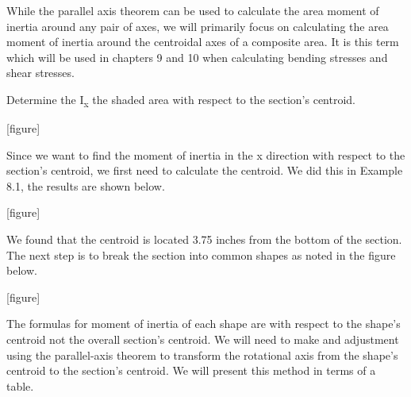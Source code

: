 \documentclass[
  letterpaper,
  DIV=11,
  numbers=noendperiod]{scrreprt}
\begin{document}
While the parallel axis theorem can be used to calculate the area moment
of inertia around any pair of axes, we will primarily focus on
calculating the area moment of inertia around the centroidal axes of a
composite area. It is this term which will be used in chapters 9 and 10
when calculating bending stresses and shear stresses.

\begin{tcolorbox}[enhanced jigsaw, breakable, opacityback=0, toptitle=1mm, left=2mm, colback=white, opacitybacktitle=0.6, colframe=quarto-callout-tip-color-frame, titlerule=0mm, arc=.35mm, leftrule=.75mm, bottomtitle=1mm, colbacktitle=quarto-callout-tip-color!10!white, rightrule=.15mm, title={Example 8.4}, bottomrule=.15mm, toprule=.15mm, coltitle=black]

Determine the I\textsubscript{x} the shaded area with respect to the
section's centroid.

{[}figure{]}

\begin{tcolorbox}[enhanced jigsaw, breakable, opacityback=0, toptitle=1mm, left=2mm, colback=white, opacitybacktitle=0.6, colframe=quarto-callout-tip-color-frame, titlerule=0mm, arc=.35mm, leftrule=.75mm, bottomtitle=1mm, colbacktitle=quarto-callout-tip-color!10!white, rightrule=.15mm, title={Solution}, bottomrule=.15mm, toprule=.15mm, coltitle=black]

Since we want to find the moment of inertia in the x direction with
respect to the section's centroid, we first need to calculate the
centroid. We did this in Example 8.1, the results are shown below.

{[}figure{]}

We found that the centroid is located 3.75 inches from the bottom of the
section. The next step is to break the section into common shapes as
noted in the figure below.

{[}figure{]}

The formulas for moment of inertia of each shape are with respect to the
shape's centroid not the overall section's centroid. We will need to
make and adjustment using the parallel-axis theorem to transform the
rotational axis from the shape's centroid to the section's centroid. We
will present this method in terms of a table.


\end{tcolorbox}
\end{tcolorbox}
\end{document}
